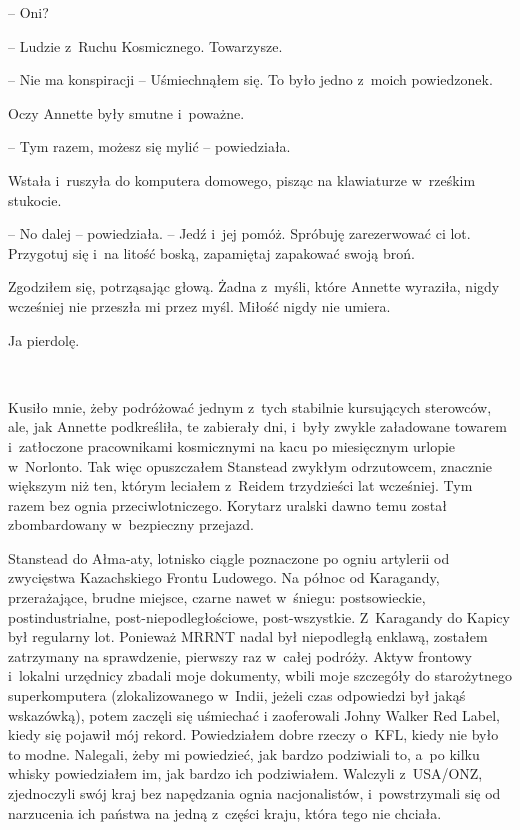 \documentclass[oneside,polish,11pt,sfheadings]{mwbk}
\begin{document}
-- Oni?

-- Ludzie z~Ruchu Kosmicznego. Towarzysze.

-- Nie ma konspiracji -- Uśmiechnąłem się. To było jedno z~moich
powiedzonek.

Oczy Annette były smutne i~poważne.

-- Tym razem, możesz się mylić -- powiedziała.

Wstała i~ruszyła do komputera domowego, pisząc na klawiaturze w~rześkim
stukocie. 

-- No dalej -- powiedziała. -- Jedź i~jej pomóż. Spróbuję
zarezerwować ci lot. Przygotuj się i~na litość boską, zapamiętaj
zapakować swoją broń.

Zgodziłem się, potrząsając głową. Żadna z~myśli, które Annette wyraziła,
nigdy wcześniej nie przeszła mi przez myśl. Miłość nigdy nie umiera.

Ja pierdolę.

~

Kusiło mnie, żeby podróżować jednym z~tych stabilnie kursujących
sterowców, ale, jak Annette podkreśliła, te zabierały dni, i~były zwykle
załadowane towarem i~zatłoczone pracownikami kosmicznymi na kacu po
miesięcznym urlopie w~Norlonto. Tak więc opuszczałem Stanstead zwykłym
odrzutowcem, znacznie większym niż ten, którym leciałem z~Reidem
trzydzieści lat wcześniej. Tym razem bez ognia przeciwlotniczego.
Korytarz uralski dawno temu został zbombardowany w~bezpieczny przejazd.

Stanstead do Ałma-aty, lotnisko ciągle poznaczone po ogniu artylerii od
zwycięstwa Kazachskiego Frontu Ludowego. Na północ od Karagandy,
przerażające, brudne miejsce, czarne nawet w~śniegu: postsowieckie,
postindustrialne, post-niepodległościowe, post-wszystkie. Z~Karagandy do Kapicy był
regularny lot. Ponieważ MRRNT nadal był niepodległą enklawą,
zostałem zatrzymany na sprawdzenie, pierwszy raz w~całej podróży. Aktyw
frontowy i~lokalni urzędnicy zbadali moje dokumenty, wbili moje
szczegóły do starożytnego superkomputera (zlokalizowanego w~Indii,
jeżeli czas odpowiedzi był jakąś wskazówką), potem zaczęli się uśmiechać
i zaoferowali Johny Walker Red Label, kiedy się pojawił mój rekord.
Powiedziałem dobre rzeczy o~KFL, kiedy nie było to modne. Nalegali, żeby
mi powiedzieć, jak bardzo podziwiali to, a~po kilku whisky powiedziałem
im, jak bardzo ich podziwiałem. Walczyli z~USA/ONZ, zjednoczyli swój
kraj bez napędzania ognia nacjonalistów, i~powstrzymali się od
narzucenia ich państwa na jedną z~części kraju, która tego nie chciała.
\end{document}
